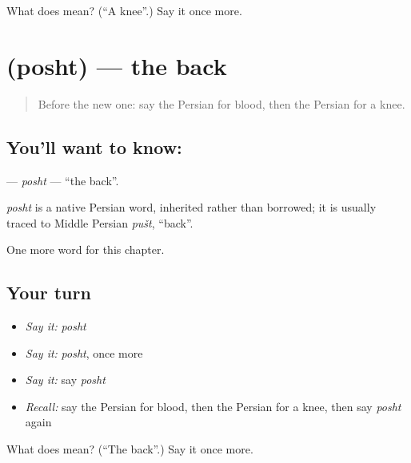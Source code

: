 \begin{tcolorbox}[breakable,colback=teal!4,colframe=teal!35!black,title={Before you move on}]
What does  mean? (\textquotedblleft{}A knee\textquotedblright{}.) Say it once more.
\end{tcolorbox}
\section[\texorpdfstring{\fa{پشت} (posht)}{پشت (posht)}]{ (posht) — the back}

\label{lesson:FA-C29-posht}



\begin{quote}
Before the new one: say the Persian for blood, then the Persian for a knee.
\end{quote}

\subsection*{You'll want to know: }
\textbf{} — \emph{posht} — \textquotedblleft{}the back\textquotedblright{}.

\begin{cousinweb}
\emph{posht} is a native Persian word, inherited rather than borrowed; it is usually traced to Middle Persian \emph{pušt}, \textquotedblleft{}back\textquotedblright{}.
\end{cousinweb}

\begin{grammarlens}[title={What you've built}]
One more word for this chapter.
\end{grammarlens}

\subsection*{Your turn}
\begin{itemize}
\raggedright
  \item \emph{Say it:} \emph{posht}
  \item \emph{Say it:} \emph{posht}, once more
  \item \emph{Say it:} say \emph{posht}
  \item \emph{Recall:} say the Persian for blood, then the Persian for a knee, then say \emph{posht} again
\end{itemize}

\begin{tcolorbox}[breakable,colback=teal!4,colframe=teal!35!black,title={Before you move on}]
What does  mean? (\textquotedblleft{}The back\textquotedblright{}.) Say it once more.
\end{tcolorbox}

